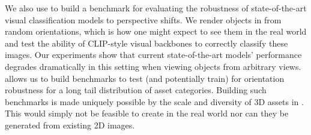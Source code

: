 We also use \data to build a benchmark for evaluating the robustness of state-of-the-art visual classification models to perspective shifts. We render objects in \data from random orientations, which is how one might expect to see them in the real world and test the ability of CLIP-style visual backbones to correctly classify these images. Our experiments show that current state-of-the-art models' performance degrades dramatically in this setting when viewing objects from arbitrary views.
\data allows us to build benchmarks to test (and potentially train) for orientation robustness for a long tail distribution of asset categories. Building such benchmarks is made uniquely possible by the scale and diversity of 3D assets in \data. This would simply not be feasible to create in the real world nor can they be generated from existing 2D images.

